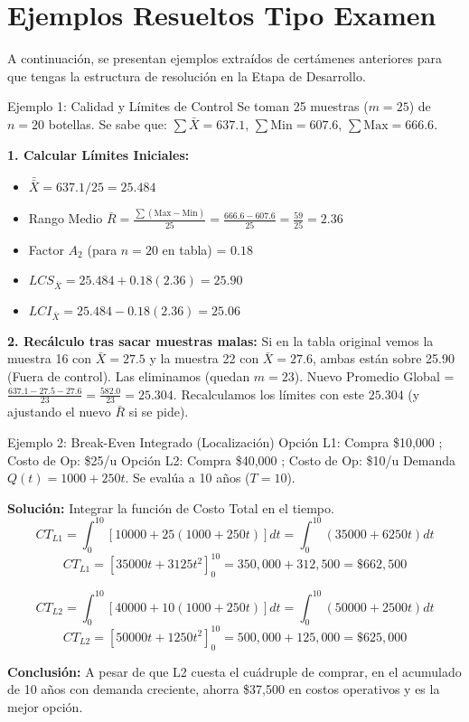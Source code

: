 \section{Ejemplos Resueltos Tipo Examen}

A continuación, se presentan ejemplos extraídos de certámenes anteriores para que tengas la estructura de resolución en la Etapa de Desarrollo.

\begin{ejercicio}{Ejemplo 1: Calidad y Límites de Control}
Se toman 25 muestras ($m=25$) de $n=20$ botellas. Se sabe que:
$\sum \bar{X} = 637.1$, $\sum \text{Min} = 607.6$, $\sum \text{Max} = 666.6$.

\textbf{1. Calcular Límites Iniciales:}
\begin{itemize}
    \item $\bar{\bar{X}} = 637.1 / 25 = 25.484$
    \item Rango Medio $\bar{R} = \frac{\sum (\text{Max} - \text{Min})}{25} = \frac{666.6 - 607.6}{25} = \frac{59}{25} = 2.36$
    \item Factor $A_2$ (para $n=20$ en tabla) = $0.18$
    \item $LCS_{\bar{X}} = 25.484 + 0.18(2.36) = 25.90$
    \item $LCI_{\bar{X}} = 25.484 - 0.18(2.36) = 25.06$
\end{itemize}

\textbf{2. Recálculo tras sacar muestras malas:}
Si en la tabla original vemos la muestra 16 con $\bar{X} = 27.5$ y la muestra 22 con $\bar{X} = 27.6$, ambas están sobre 25.90 (Fuera de control).
Las eliminamos (quedan $m = 23$).
Nuevo Promedio Global = $\frac{637.1 - 27.5 - 27.6}{23} = \frac{582.0}{23} = 25.304$.
Recalculamos los límites con este $25.304$ (y ajustando el nuevo $\bar{R}$ si se pide).
\end{ejercicio}

\begin{ejercicio}{Ejemplo 2: Break-Even Integrado (Localización)}
Opción L1: Compra \$10,000 ; Costo de Op: \$25/u
Opción L2: Compra \$40,000 ; Costo de Op: \$10/u
Demanda $Q(t) = 1000 + 250t$. Se evalúa a 10 años ($T=10$).

\textbf{Solución:} Integrar la función de Costo Total en el tiempo.
$$ CT_{L1} = \int_0^{10} [10000 + 25(1000 + 250t)] dt = \int_0^{10} (35000 + 6250t) dt $$
$$ CT_{L1} = [35000t + 3125t^2]_0^{10} = 350,000 + 312,500 = \$662,500 $$

$$ CT_{L2} = \int_0^{10} [40000 + 10(1000 + 250t)] dt = \int_0^{10} (50000 + 2500t) dt $$
$$ CT_{L2} = [50000t + 1250t^2]_0^{10} = 500,000 + 125,000 = \$625,000 $$

\textbf{Conclusión:} A pesar de que L2 cuesta el cuádruple de comprar, en el acumulado de 10 años con demanda creciente, ahorra \$37,500 en costos operativos y es la mejor opción.
\end{ejercicio}

